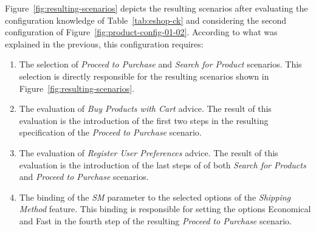 \documentclass{acm_proc_article-sp}
\begin{document}
{\color{red} Figure~\ref{fig:resulting-scenarios} depicts the resulting scenarios after evaluating the configuration knowledge of
Table~\ref{tab:eshop-ck} and considering the second configuration of
Figure~\ref{fig:product-config-01-02}. According to what was explained in the previous, this configuration 
requires: 

\begin{enumerate} 
 \item The selection of \emph{Proceed to Purchase} and \emph{Search for Product} scenarios. This selection is directly responsible 
for the resulting scenarios shown in Figure~\ref{fig:resulting-scenarios}. 
  
 \item The evaluation of \emph{Buy Products with Cart} advice. The result of this evaluation is the introduction of the 
first two steps in the resulting specification of the \emph{Proceed to Purchase} scenario. 
 
 \item The evaluation of \emph{Register User Preferences} advice. The result of this evaluation is the introduction of the last steps 
of of both \emph{Search for Products} and \emph{Proceed to Purchase} scenarios. 

 \item The binding of the \emph{SM} parameter to the selected options of the \emph{Shipping Method} feature. This binding is responsible for 
 setting the options Economical and Fast in the fourth step of the resulting \emph{Proceed to Purchase} scenario.

\end{enumerate}
}
 
\end{document}
